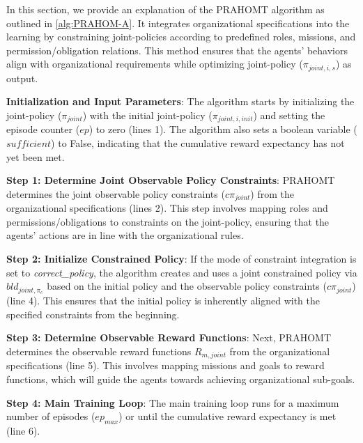 \documentclass[runningheads]{llncs}
\theoremstyle{freethm}
\theoremstyle{proofoutline}
\newcounter{relation}
\begin{document}

In this section, we provide an explanation of the PRAHOMT algorithm as outlined in \autoref{alg:PRAHOM-A}. It integrates organizational specifications into the learning by constraining joint-policies according to predefined roles, missions, and permission/obligation relations. This method ensures that the agents' behaviors align with organizational requirements while  optimizing joint-policy ($\pi_{joint,i,s}$) as output.

\textbf{Initialization and Input Parameters}: \quad
The algorithm starts by initializing the joint-policy ($\pi_{joint}$) with the initial joint-policy ($\pi_{joint,i,init}$) and setting the episode counter ($ep$) to zero (lines 1). The algorithm also sets a boolean variable ($sufficient$) to False, indicating that the cumulative reward expectancy has not yet been met.

\textbf{Step 1: Determine Joint Observable Policy Constraints}: \quad
PRAHOMT determines the joint observable policy constraints ($c\pi_{joint}$) from the organizational specifications (lines 2). This step involves mapping roles and permissions/obligations to constraints on the joint-policy, ensuring that the agents' actions are in line with the organizational rules.

\textbf{Step 2: Initialize Constrained Policy}: \quad
If the mode of constraint integration is set to \textit{correct\_policy}, the algorithm creates and uses a joint constrained policy via $bld_{joint, \pi_c}$ based on the initial policy and the observable policy constraints ($c\pi_{joint}$) (line 4). This ensures that the initial policy is inherently aligned with the specified constraints from the beginning.

\textbf{Step 3: Determine Observable Reward Functions}: \quad
Next, PRAHOMT determines the observable reward functions $R_{m,joint}$ from the organizational specifications (line 5). This involves mapping missions and goals to reward functions, which will guide the agents towards achieving organizational sub-goals.

\textbf{Step 4: Main Training Loop}: \quad
The main training loop runs for a maximum number of episodes ($ep_{max}$) or until the cumulative reward expectancy is met (line 6).
\end{document}
